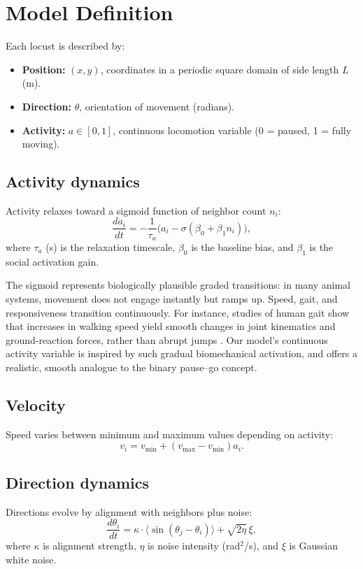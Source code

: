 \documentclass[11pt,a4paper]{article}
\begin{document}
\section{Model Definition}

Each locust is described by:
\begin{itemize}
    \item \textbf{Position:} $(x,y)$, coordinates in a periodic square domain of side length $L$ (m).
    \item \textbf{Direction:} $\theta$, orientation of movement (radians).
    \item \textbf{Activity:} $a \in [0,1]$, continuous locomotion variable (0 = paused, 1 = fully moving).
\end{itemize}

\subsection{Activity dynamics}
Activity relaxes toward a sigmoid function of neighbor count $n_i$:
\[
\frac{da_i}{dt} = -\frac{1}{\tau_a}\Big(a_i - \sigma(\beta_0 + \beta_1 n_i)\Big),
\]
where $\tau_a$ (s) is the relaxation timescale, $\beta_0$ is the baseline bias, and $\beta_1$ is the social activation gain.

The sigmoid represents biologically plausible graded transitions: in many animal systems, movement does not engage instantly but ramps up. Speed, gait, and responsiveness transition continuously. For instance, studies of human gait show that increases in walking speed yield smooth changes in joint kinematics and ground-reaction forces, rather than abrupt jumps \cite{fukuchi2019gait}. Our model's continuous activity variable is inspired by such gradual biomechanical activation, and offers a realistic, smooth analogue to the binary pause–go concept.


\subsection{Velocity}
Speed varies between minimum and maximum values depending on activity:
\[
v_i = v_{\min} + (v_{\max} - v_{\min}) a_i.
\]

\subsection{Direction dynamics}
Directions evolve by alignment with neighbors plus noise:
\[
\frac{d\theta_i}{dt} = \kappa \cdot \langle \sin(\theta_j - \theta_i)\rangle + \sqrt{2\eta}\,\xi,
\]
where $\kappa$ is alignment strength, $\eta$ is noise intensity (rad$^2$/s), and $\xi$ is Gaussian white noise.
\end{document}
